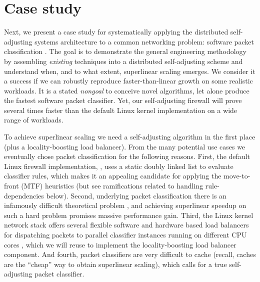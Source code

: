 \section{Case study }\label{sec:case-study}

Next, we present a case study for systematically applying the distributed self-adjusting systems architecture to a common networking problem: software packet classification \cite{gupta2001algorithms}. The goal is to demonstrate the general engineering methodology by assembling \emph{existing} techniques into a distributed self-adjusting scheme and understand when, and to what extent, superlinear scaling emerges. We consider it a success if we can robustly reproduce faster-than-linear growth on some realistic workloads. It is a stated \emph{nongoal} to conceive novel algorithms, let alone produce the fastest software packet classifier. %
Yet, our self-adjusting firewall will prove several times faster than the default Linux kernel implementation on a wide range of workloads.

To achieve superlinear scaling we need a self-adjusting algorithm in the first place (plus a locality-boosting load balancer). From the many potential use cases %
\cite{SleatorT85Splay, BentleyCL93, HesterH85, HesterH85, BentleySTW86, Avin0020, ParkM12} we eventually chose packet classification for the following reasons.  First, the default Linux firewall implementation, \nftables, uses a static doubly linked list to evaluate classifier rules, which makes it an appealing candidate for applying the move-to-front (MTF) heuristics (but see ramifications related to handling rule-dependencies below). %
Second, underlying packet classification there is an infamously difficult theoretical problem \cite{10.1145/2619239.2626294,10.1006/jagm.1996.0063, PacutVAPRS2022, 10.1145/2619239.2626294, 10.1145/1851182.1851208, 10.1145/863955.863980, gupta2001algorithms}, %
and achieving superlinear speedup on such a hard problem promises massive performance gain. Third, the Linux kernel network stack offers several flexible software and hardware based load balancers for dispatching packets to parallel classifier instances running on different CPU cores \cite{rss-linux}, which we will reuse to implement the locality-boosting load balancer component. And fourth, packet classifiers are very difficult to cache \cite{1354643} (recall, caches are the ``cheap'' way to obtain superlinear scaling), which calls for a true self-adjusting packet classifier. %

